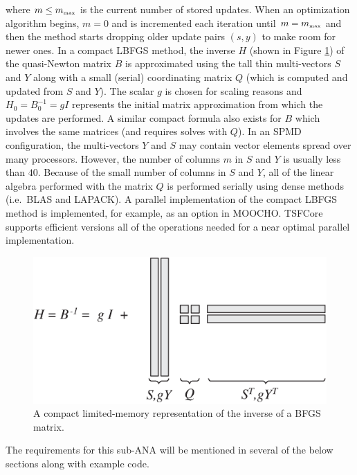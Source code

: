 where $m \le m_{\tiny\mbox{max}}$ is the current number of stored
updates.  When an optimization algorithm begins, $m=0$ and is
incremented each iteration until $m = m_{\tiny\mbox{max}}$ and then
the method starts dropping older update pairs $(s,y)$ to make room for
newer ones.  In a compact LBFGS method, the inverse $H$ (shown in
Figure \ref{tsfcore:fig:LBFGS}) of the quasi-Newton matrix $B$ is
approximated using the tall thin multi-vectors $S$ and $Y$ along with
a small (serial) coordinating matrix $Q$ (which is computed and
updated from $S$ and $Y$).  The scalar $g$ is chosen for scaling
reasons and $H_0 = B_0^{-1} = g I$ represents the initial matrix
approximation from which the updates are performed.  A similar compact
formula also exists for $B$ which involves the same matrices (and
requires solves with $Q$).  In an SPMD configuration, the
multi-vectors $Y$ and $S$ may contain vector elements spread over many
processors.  However, the number of columns $m$ in $S$ and $Y$ is
usually less than $40$.  Because of the small number of columns in $S$
and $Y$, all of the linear algebra performed with the matrix $Q$ is
performed serially using dense methods (i.e.~BLAS and LAPACK).  A
parallel implementation of the compact LBFGS method is implemented,
for example, as an option in MOOCHO.  TSFCore supports efficient
versions all of the operations needed for a near optimal parallel
implementation.

{\bsinglespace
\begin{figure}[t]
\begin{center}
\includegraphics*[bb= 0.0in 0.0in 7.0in 3.7in,angle=0,scale=0.60
]{LBFGS}
\end{center}
\caption{
\label{tsfcore:fig:LBFGS}
A compact limited-memory representation of the inverse of a BFGS matrix.
}
\end{figure}
\esinglespace}

The requirements for this sub-ANA will be mentioned in several of the
below sections along with example code.

